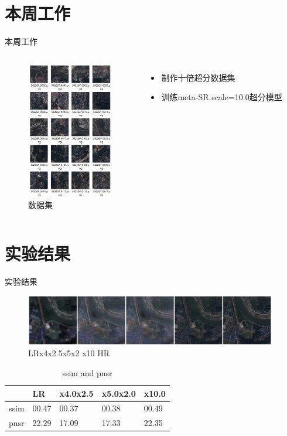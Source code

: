 \section{本周工作}
\begin{frame}{本周工作}
    \begin{columns}
        \begin{figure}
            \centering
            \includegraphics[height=6cm]{pic/pic0101.jpg}
            \caption{数据集}
            \label{fig:0101}
        \end{figure}

        \begin{itemize}
            \item 制作十倍超分数据集         
            \item 训练meta-SR scale=10.0超分模型
        \end{itemize}
    \end{columns}
\end{frame}

\section{实验结果}
\begin{frame}{实验结果}
    \begin{figure}
        \centering
        \includegraphics[width=11cm]{pic/pic0102.jpg}
        \caption{LR\quad x4x2.5\quad x5x2 \quad x10 \quad HR}
        \label{fig:0102}
    \end{figure} 

    \begin{table}[h]
        \centering
        \begin{tabular}{ m{1.5cm} | m{1.5cm} | m{1.5cm} | m{1.5cm} | m{1.5cm}}
            \hline
             & LR & x4.0x2.5 & x5.0x2.0 & x10.0 \\ \hline
            ssim & 00.47 & 00.37 & 00.38 & 00.49 \\ \hline       
            pnsr & 22.29  & 17.09 & 17.33 & 22.35\\ \hline           
        \end{tabular}
        \caption{ssim and pnsr}
    \end{table}
\end{frame}

